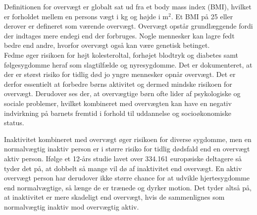 Definitionen for overvægt er globalt sat ud fra et body mass index (BMI), hvilket er forholdet mellem en persons vægt i kg og højde i m$^2$. Et BMI på 25 eller derover er defineret som værende overvægt.\citep{Academic2016}  Overvægt opstår grundlæggende fordi der indtages mere endegi end der forbruges. Nogle mennesker kan lagre fedt bedre end andre, hvorfor overvægt også kan være genetisk betinget.\citep{Nestle2014}\\
Fedme øger risikoen for højt kolesteroltal, forhøjet blodtryk og diabetes samt følgesygdomme heraf som slagtilfælde og nyresygdomme. Det er dokumenteret, at der er størst risiko for tidlig død jo yngre mennesker opnår overvægt. Det er derfor essentielt at forbedre børns aktivitet og dermed mindske risikoen for overvægt.\citep{Nestle2014} Derudover ses der, at overvægtige børn ofte lider af psykologiske og sociale problemer, hvilket kombineret med overvægten kan have en negativ indvirkning på barnets fremtid i forhold til uddannelse og socioøkonomiske status\citep{Academic2016}.

Inaktivitet kombineret med overvægt øger risikoen for diverse sygdomme, men en normalvægtig inaktiv person er i større risiko for tidlig dødsfald end en overvægt aktiv person. Ifølge et 12-års studie lavet over 334.161 europæiske deltagere så tyder det på, at dobbelt så mange vil dø af inaktivitet end overvægt.\citep{Ekelund2015} En aktiv overvægt person har derudover ikke større chance for at udvikle hjertesygdomme end normalvægtige, så længe de er trænede og dyrker motion\citep{Nichols2014}. Det tyder altså på, at inaktivitet er mere skadeligt end overvægt, hvis de sammenlignes som normalvægtig inaktiv mod overvægtig aktiv.

